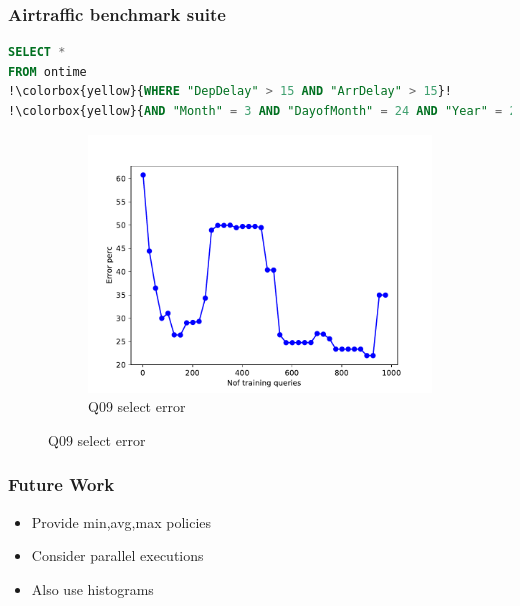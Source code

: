 \begin{frame}[fragile]
\frametitle{Airtraffic benchmark suite}
\begin{lstlisting}[basicstyle=\ttfamily\footnotesize, language=SQL, escapechar=!]
SELECT *
FROM ontime
!\colorbox{yellow}{WHERE "DepDelay" > 15 AND "ArrDelay" > 15}!
!\colorbox{yellow}{AND "Month" = 3 AND "DayofMonth" = 24 AND "Year" = 2013}!
\end{lstlisting}
	\begin{figure}[!htb]
	  \begin{subfigure}[t]{0.5\textwidth}
	    \includegraphics[scale=0.4]{../figs/airtraffic/airtraffic_sel09_error.pdf}
	    \caption{Q09 select error}
	    \label{fig:sel04}
	  \end{subfigure}
	\end{figure}
\end{frame}


\begin{frame}[fragile]
\frametitle{Future Work}
\begin{block}{}
\begin{itemize}
\item Provide min,avg,max policies
\item Consider parallel executions
\item Also use histograms
\end{itemize}
\end{block}
\end{frame}
